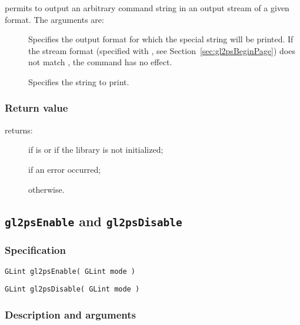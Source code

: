  permits to output an arbitrary command string in an
output stream of a given format. The arguments are:

\begin{description}
\item[] Specifies the output format for which the special
  string will be printed. If the stream format (specified with
  , see Section~\ref{sec:gl2psBeginPage}) does not
  match , the command has no effect.
\item[] Specifies the string to print.
\end{description}

\subsubsection{Return value}

\noindent{} returns:
\begin{description}
\item[] if  is  or if the
  library is not initialized;
\item[] if an error occurred;
\item[] otherwise.
\end{description}


\subsection{\texttt{gl2psEnable} and \texttt{gl2psDisable}}
\label{sec:gl2psEnable}

\subsubsection{Specification}

\begin{verbatim}
GLint gl2psEnable( GLint mode )
\end{verbatim}

\begin{verbatim}
GLint gl2psDisable( GLint mode )
\end{verbatim}

\subsubsection{Description and arguments}

